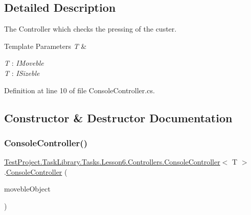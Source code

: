\subsection{Detailed Description}
The Controller which checks the pressing of the custer. 


\begin{DoxyTemplParams}{Template Parameters}
{\em T} & \\
\hline
\end{DoxyTemplParams}
\begin{Desc}
\item[Type Constraints]\begin{description}
\item[{\em T} : {\em I\+Moveble}]\item[{\em T} : {\em I\+Sizeble}]\end{description}
\end{Desc}


Definition at line 10 of file Console\+Controller.\+cs.



\subsection{Constructor \& Destructor Documentation}
\mbox{\label{class_test_project_1_1_task_library_1_1_tasks_1_1_lesson6_1_1_controllers_1_1_console_controller_abe440b796b1574349a0d21652b9442b0}} 
\subsubsection{\texorpdfstring{ConsoleController()}{ConsoleController()}}
{\footnotesize\ttfamily \mbox{\hyperlink{class_test_project_1_1_task_library_1_1_tasks_1_1_lesson6_1_1_controllers_1_1_console_controller}{Test\+Project.\+Task\+Library.\+Tasks.\+Lesson6.\+Controllers.\+Console\+Controller}}$<$ T $>$.\mbox{\hyperlink{class_test_project_1_1_task_library_1_1_tasks_1_1_lesson6_1_1_controllers_1_1_console_controller}{Console\+Controller}} (\begin{DoxyParamCaption}\item[{T}]{moveble\+Object }\end{DoxyParamCaption})}



